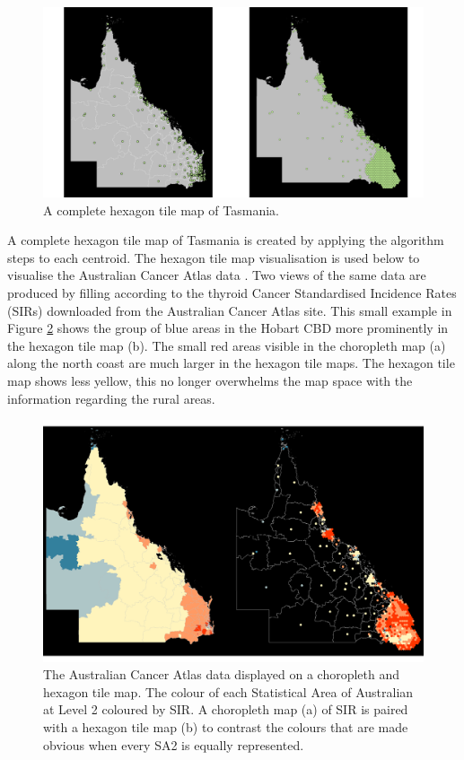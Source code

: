 \begin{figure}[h]
\centering
\includegraphics[width=16cm]{figs/6allocate.png}
\caption{\label{fig:buffs}A complete hexagon tile map of Tasmania.}
\end{figure}

A complete hexagon tile map of Tasmania is created by applying the
algorithm steps to each centroid. The hexagon tile map visualisation is
used below to visualise the Australian Cancer Atlas data \citep{TACA}.
Two views of the same data are produced by filling according to the
thyroid Cancer Standardised Incidence Rates (SIRs) downloaded from the
Australian Cancer Atlas site. This small example in Figure \ref{fig:sir}
shows the group of blue areas in the Hobart CBD more prominently in the
hexagon tile map (b). The small red areas visible in the choropleth map
(a) along the north coast are much larger in the hexagon tile maps. The
hexagon tile map shows less yellow, this no longer overwhelms the map
space with the information regarding the rural areas.

\begin{figure}[h]
\centering
\includegraphics[width=14cm]{figs/7SIR.png}
\caption{\label{fig:sir}The Australian Cancer Atlas data displayed on a choropleth and hexagon tile map. The colour of each Statistical Area of Australian at Level 2 coloured by SIR. A choropleth map (a) of SIR is paired with a hexagon tile map (b) to contrast the colours that are made obvious when every SA2 is equally represented.}
\end{figure}

